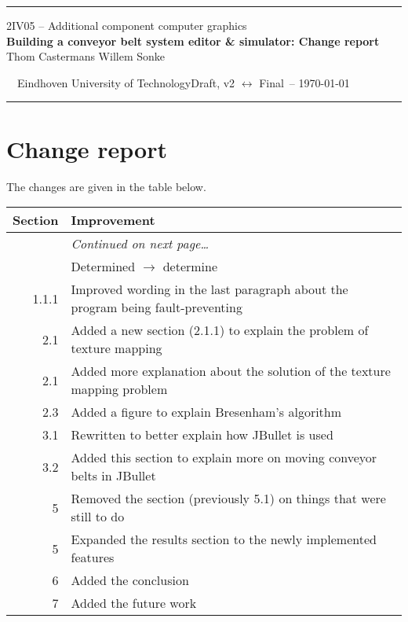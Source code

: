 \documentclass[a4paper,10pt]{article}
\newcommand*{\accgtitle}{Building a conveyor belt system editor \& simulator: Change report\xspace}
\newcommand*{\accgversion}{Draft, v2 $\leftrightarrow$ Final\xspace}
\begin{document}
\begin{adjustwidth}{0.05\textwidth}{0.05\textwidth}  
  \textcolor{accgblue}{\rule{0.9\textwidth}{0.8pt}}
  
  \begin{center}
    \large 2IV05 -- Additional component computer graphics\\
    \Large\textbf{\accgtitle}\\[10pt]
    \normalsize Thom Castermans \qquad Willem Sonke
  \end{center}
  
  \vspace{10pt}\noindent\footnotesize~~Eindhoven University of Technology\hfill\accgversion\ -- \today~~
  
  \vspace{-6pt}\noindent\textcolor{accgblue}{\rule{0.9\textwidth}{0.8pt}}
\end{adjustwidth}

\begin{abstract}
 This document details the changes between the second draft version of the report (version ``Draft, v2'' of 14 March 2014) and the final version (version ``Final'' of 22 April 2014).
\end{abstract}

\section*{Change report}
The changes are given in the table below.

\begin{longtabu}{r>{\raggedright}X<{\strut}}
  \toprule
  \textbf{Section} & \textbf{Improvement} \\
  \midrule
  \endhead
  \bottomrule
  & \vspace*{-5pt}\hfill\textit{Continued on next page\ldots} \\
  \endfoot
  \bottomrule
   & Determined $\rightarrow$ determine \\
  1.1.1 & Improved wording in the last paragraph about the program being fault-preventing \\
  2.1 & Added a new section (2.1.1) to explain the problem of texture mapping \\
  2.1 & Added more explanation about the solution of the texture mapping problem \\
  2.3 & Added a figure to explain Bresenham's algorithm \\
  3.1 & Rewritten to better explain how JBullet is used \\
  3.2 & Added this section to explain more on moving conveyor belts in JBullet \\
  5 & Removed the section (previously 5.1) on things that were still to do \\
  5 & Expanded the results section to the newly implemented features \\
  6 & Added the conclusion \\
  7 & Added the future work \\
\end{longtabu}
\end{document}
